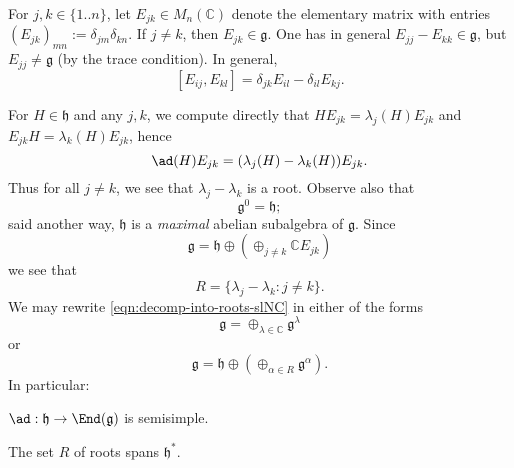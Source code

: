 \documentclass[reqno]{amsart} 
\begin{document}
For $j,k \in \{1..n\}$, let $E_{j k} \in M_n(\mathbb{C})$ denote the elementary matrix with entries $(E_{j k})_{m n} := \delta_{j m} \delta_{k n}$.  If $j \neq k$, then $E_{j k} \in \mathfrak{g}$.  One has in general $E_{j j} - E_{k k} \in \mathfrak{g}$, but $E_{j j} \neq \mathfrak{g}$ (by the trace condition).  In general,
\begin{equation}\label{eq:commutators-of-elementary-matrices}
  {} [E_{i j}, E_{k l}]
  = \delta_{j k} E_{i l}
  - \delta_{i l} E_{k j}.
\end{equation}

For $H \in \mathfrak{h}$ and any $j,k$, we compute directly that $H E_{j k} = \lambda_j(H) E_{j k}$ and $E_{j k} H = \lambda_k(H) E_{j k}$, hence
\begin{equation}
  \ad(H) E_{j k}
  = (\lambda_j(H) - \lambda_k(H)) E_{j k}.
\end{equation}
Thus for all $j \neq k$, we see that $\lambda_j - \lambda_k$ is a root.  Observe also that
\begin{equation}\label{eq:h-self-centralizing-slN}
  \mathfrak{g}^0 = \mathfrak{h};
\end{equation}
said another way, $\mathfrak{h}$ is a \emph{maximal} abelian subalgebra of $\mathfrak{g}$.  Since
\begin{equation}\label{eqn:decomp-into-roots-slNC}
  \mathfrak{g} = \mathfrak{h} \oplus (\oplus_{j \neq k}
  \mathbb{C} E_{j k})
\end{equation}
we see that
\begin{equation}\label{eq:roots-of-slN}
  R = \{\lambda_j - \lambda_k : j \neq k\}.
\end{equation}
We may rewrite \eqref{eqn:decomp-into-roots-slNC} in either of the forms
\begin{equation}\label{eqn:decomp-into-roots-slNC-2}
  \mathfrak{g} = \oplus_{\lambda \in \mathbb{C}}
  \mathfrak{g}^\lambda
\end{equation}
or
\begin{equation}\label{eqn:decomp-into-roots-slNC-3}
  \mathfrak{g} = \mathfrak{h} \oplus (\oplus_{\alpha \in R}
  \mathfrak{g}^\alpha).
\end{equation}
In particular:
\begin{lemma}\label{lem:adjoint-action-cartan-slNC-is-semisimple}
  $\ad : \mathfrak{h} \rightarrow \End(\mathfrak{g})$ is semisimple.
\end{lemma}
\begin{lemma}\label{lem:roots-span}
  The set $R$ of roots spans $\mathfrak{h}^*$.
\end{lemma}
\end{document}
